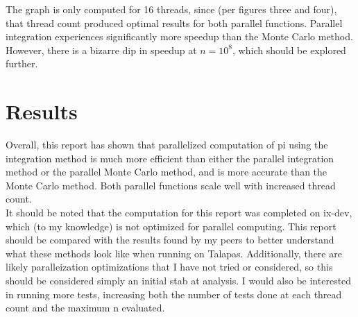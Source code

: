\documentclass[a4paper]{article}
\begin{document}
The graph is only computed for 16 threads, since (per figures three and four), that thread count produced optimal results for both parallel functions. Parallel integration experiences significantly more speedup than the Monte Carlo method. However, there is a bizarre dip in speedup at $n = 10^8$, which should be explored further. 

\section{Results}
Overall, this report has shown that parallelized computation of pi using the integration method is much more efficient than either the parallel integration method or the parallel Monte Carlo method, and is more accurate than the Monte Carlo method. Both parallel functions scale well with increased thread count.\\
It should be noted that the computation for this report was completed on ix-dev, which (to my knowledge) is not optimized for parallel computing. This report should be compared with the results found by my peers to better understand what these methods look like when running on Talapas. Additionally, there are likely paralleization optimizations that I have not tried or considered, so this should be considered simply an initial stab at analysis. I would also be interested in running more tests, increasing both the number of tests done at each thread count and the maximum n evaluated. 
\end{document}
